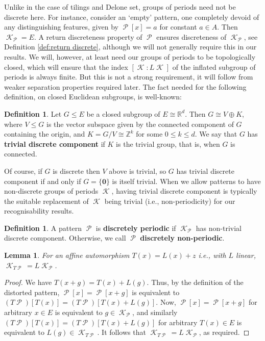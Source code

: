 \documentclass[11pt]{amsart}
\numberwithin{equation}{section}
\theoremstyle{plain}
\newtheorem{lemma}[theorem]{Lemma}
\theoremstyle{definition}
\newtheorem{definition}[theorem]{Definition}
\newcommand{\R}{\mathbb R}
\newcommand{\Z}{\mathbb Z}
\DeclareMathOperator{\cP}{\mathcal{P}}
\DeclareMathOperator{\cK}{\mathcal{K}}
\begin{document}
Unlike in the case of tilings and Delone set, groups of periods need not be discrete here. For instance, consider an `empty' pattern, one completely devoid of any distinguishing features, given by \(\cP[x] = a\) for constant \(a \in A\). Then \(\cK_{\cP} = E\). A return discreteness property of \(\cP\) ensures discreteness of \(\cK_{\cP}\), see Definition \ref{def:return discrete}, although we will not generally require this in our results. We will, however, at least need our groups of periods to be topologically closed, which will ensure that the index \([\cK : L\cK]\) of the inflated subgroup of periods is always finite. But this is not a strong requirement, it will follow from weaker separation properties required later. The fact needed for the following definition, on closed Euclidean subgroups, is well-known:

\begin{definition}\label{def:discrete component}
Let \(G \leqslant E\) be a closed subgroup of \(E \cong \R^d\). Then \(G \cong V \oplus K\), where \(V \leqslant G\) is the vector subspace given by the connected component of \(G\) containing the origin, and \(K = G/V \cong \Z^k\) for some \(0 \leq k \leq d\). We say that \(G\) has \textbf{trivial discrete component} if \(K\) is the trivial group, that is, when \(G\) is connected.
\end{definition}

Of course, if \(G\) is discrete then \(V\) above is trivial, so \(G\) has trivial discrete component if and only if \(G = \{\mathbf{0}\}\) is itself trivial. When we allow patterns to have non-discrete groups of periods \(\cK\), having trivial discrete component is typically the suitable replacement of \(\cK\) being trivial (i.e., non-periodicity) for our recognisability results.

\begin{definition}\label{def:discretely periodic}
A pattern \(\cP\) is \textbf{discretely periodic} if \(\cK_{\cP}\) has non-trivial discrete component. Otherwise, we call \(\cP\) \textbf{discretely non-periodic}.
\end{definition}

\begin{lemma}\label{lem:periods of distorted patterns}
For an affine automorphism \(T(x) = L(x) + z\) i.e., with \(L\) linear, \(\cK_{T\cP} = L\cK_{\cP}\).
\end{lemma}

\begin{proof}
We have \(T(x+g) = T(x) + L(g)\). Thus, by the definition of the distorted pattern, \(\cP[x] = \cP[x + g]\) is equivalent to \((T\cP)[T(x)] = (T\cP)[T(x) + L(g)]\). Now, \(\cP[x] = \cP[x+g]\) for arbitrary \(x \in E\) is equivalent to \(g \in \cK_{\cP}\), and similarly \((T\cP)[T(x)] = (T\cP)[T(x) + L(g)]\) for arbitrary \(T(x) \in E\) is equivalent to \(L(g) \in \cK_{T\cP}\). It follows that \(\cK_{T\cP} = L\cK_{\cP}\), as required.
\end{proof}
\end{document}
